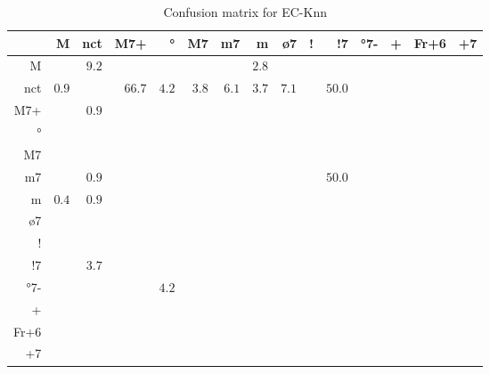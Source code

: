 \documentclass{article}
\begin{document}
\begin{table}
\begin{center}
\begin{tabular}{r|r|r|r|r|r|r|r|r|r|r|r|r|r|r}
       & M & nct & M7+ & ° & M7 & m7 & m & ø7 & ! & !7 & °7- & + & Fr+6 & +7 \\ \hline
 M & $ $ & $9.2$ & $ $ & $ $ & $ $ & $ $ & $2.8$ & $ $ & $ $ & $ $ & $ $ & $ $ & $ $ & $ $  \\ \hline
 nct & $0.9$ & $ $ & $66.7$ & $4.2$ & $3.8$ & $6.1$ & $3.7$ & $7.1$ & $ $ & $50.0$ & $ $ & $ $ & $ $ & $ $  \\ \hline
 M7+ & $ $ & $0.9$ & $ $ & $ $ & $ $ & $ $ & $ $ & $ $ & $ $ & $ $ & $ $ & $ $ & $ $ & $ $  \\ \hline
 ° & $ $ & $ $ & $ $ & $ $ & $ $ & $ $ & $ $ & $ $ & $ $ & $ $ & $ $ & $ $ & $ $ & $ $  \\ \hline
 M7 & $ $ & $ $ & $ $ & $ $ & $ $ & $ $ & $ $ & $ $ & $ $ & $ $ & $ $ & $ $ & $ $ & $ $  \\ \hline
 m7 & $ $ & $0.9$ & $ $ & $ $ & $ $ & $ $ & $ $ & $ $ & $ $ & $50.0$ & $ $ & $ $ & $ $ & $ $  \\ \hline
 m & $0.4$ & $0.9$ & $ $ & $ $ & $ $ & $ $ & $ $ & $ $ & $ $ & $ $ & $ $ & $ $ & $ $ & $ $  \\ \hline
 ø7 & $ $ & $ $ & $ $ & $ $ & $ $ & $ $ & $ $ & $ $ & $ $ & $ $ & $ $ & $ $ & $ $ & $ $  \\ \hline
 ! & $ $ & $ $ & $ $ & $ $ & $ $ & $ $ & $ $ & $ $ & $ $ & $ $ & $ $ & $ $ & $ $ & $ $  \\ \hline
 !7 & $ $ & $3.7$ & $ $ & $ $ & $ $ & $ $ & $ $ & $ $ & $ $ & $ $ & $ $ & $ $ & $ $ & $ $  \\ \hline
 °7- & $ $ & $ $ & $ $ & $4.2$ & $ $ & $ $ & $ $ & $ $ & $ $ & $ $ & $ $ & $ $ & $ $ & $ $  \\ \hline
 + & $ $ & $ $ & $ $ & $ $ & $ $ & $ $ & $ $ & $ $ & $ $ & $ $ & $ $ & $ $ & $ $ & $ $  \\ \hline
 Fr+6 & $ $ & $ $ & $ $ & $ $ & $ $ & $ $ & $ $ & $ $ & $ $ & $ $ & $ $ & $ $ & $ $ & $ $  \\ \hline
 +7 & $ $ & $ $ & $ $ & $ $ & $ $ & $ $ & $ $ & $ $ & $ $ & $ $ & $ $ & $ $ & $ $ & $ $  \\ \hline
\end{tabular}
\caption{Confusion matrix for EC-Knn}
\end{center}
\end{table}
\end{document}
